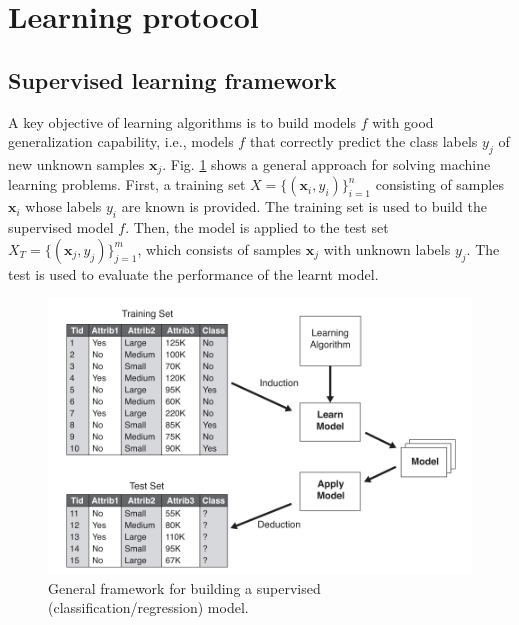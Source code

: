 \section{Learning protocol}
\subsection{Supervised learning framework}

A key objective of learning algorithms is to build models $f$ with good generalization capability, i.e., models $f$ that correctly predict the class labels $y_j$ of new unknown samples $\textbf{x}_j$. Fig. \ref{fig:LearningFramework} shows a general approach for solving machine learning problems. First, a training set $X=\{(\textbf{x}_i,y_i)\}_{i=1}^n$ consisting of samples $\textbf{x}_i$ whose labels $y_i$ are known is provided. The training set is used to build the supervised model $f$. Then, the model is applied to the test set $X_T=\{(\textbf{x}_j,y_j)\}_{j=1}^m$, which consists of samples $\textbf{x}_j$ with unknown labels $y_j$. The test is used to evaluate the performance of the learnt model. 

\begin{figure}[h!]
\centering
\includegraphics[width=0.7\linewidth]{images/LearningFramework}
\caption{General framework for building a supervised (classification/regression) model.}
\label{fig:LearningFramework}
\end{figure}


